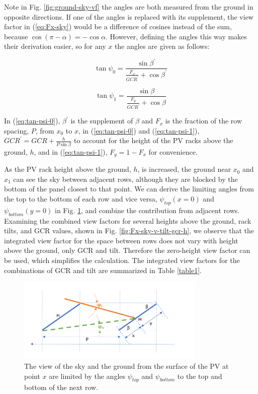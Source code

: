 \documentclass[conference]{IEEEtran}
\begin{document}
Note in Fig. \ref{fig:ground-sky-vf} the angles are both measured from the ground in opposite directions.  If one of the angles is replaced with its supplement, the view factor in (\ref{eq:Fx-sky}) would be a difference of cosines instead of the sum, because $\cos \left(\pi - \alpha\right) = -\cos \alpha$.  However, defining the angles this way makes their derivation easier, so for any $x$ the angles are given as follows:

\begin{equation}
\tan \psi_0 = \frac{\sin \beta^\prime}{\frac{F_x}{GCR^\prime} + \cos \beta^\prime}
\label{eq:tan-psi-0}
\end{equation}

\begin{equation}
\tan \psi_1 = \frac{\sin \beta}{\frac{F_y}{GCR^\prime} + \cos \beta}
\label{eq:tan-psi-1}
\end{equation}

In (\ref{eq:tan-psi-0}), $\beta^\prime$ is the supplement of $\beta$ and $F_x$ is the fraction of the row spacing, $P$, from $x_0$ to $x$, in (\ref{eq:tan-psi-0}) and (\ref{eq:tan-psi-1}), $GCR^\prime=GCR+\frac{h}{P\sin\beta}$ to account for the height of the PV racks above the ground, $h$, and in (\ref{eq:tan-psi-1}), $F_y=1-F_x$ for convenience.

As the PV rack height above the ground, $h$, is increased, the ground near $x_0$ and $x_1$ can see the sky between adjacent rows, although they are blocked by the bottom of the panel closest to that point.  We can derive the limiting angles from the top to the bottom of each row and vice versa, $\psi_{top}\left(x=0\right)$ and $\psi_{bottom}\left(y=0\right)$ in Fig. \ref{fig:nextrow-vf-angles}, and combine the contribution from adjacent rows.  Examining the combined view factors for several heights above the ground, rack tilts, and GCR values, shown in Fig. \ref{fig:Fx-sky-v-tilt-gcr-h}, we observe that the integrated view factor for the space between rows does not vary with height above the ground, only GCR and tilt.  Therefore the zero-height view factor can be used, which simplifies the calculation.  The integrated view factors for the combinations of GCR and tilt are summarized in Table \ref{table1}.

\begin{figure}
\centering
\includegraphics[width=9cm]{next-row-view-factor-angles.png}
\caption{The view of the sky and the ground from the surface of the PV at point $x$ are limited by the angles $\psi_{top}$ and $\psi_{bottom}$ to the top and bottom of the next row.}
\label{fig:nextrow-vf-angles}
\end{figure}
\end{document}
